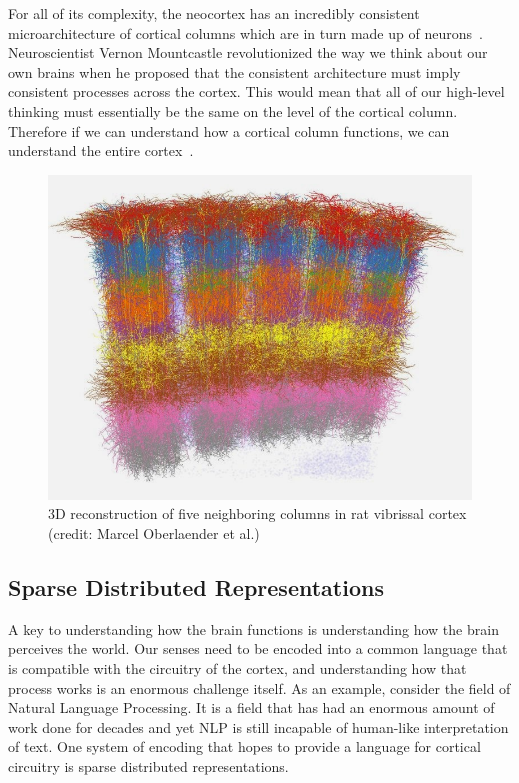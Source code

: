 \documentclass[oneside,12pt,openany]{book}
\begin{document}
	For all of its complexity, the neocortex has an incredibly consistent microarchitecture of cortical columns which are in turn made up of neurons~\cite{DiscoveriesBrainWorks}. Neuroscientist Vernon Mountcastle revolutionized the way we think about our own brains when he proposed that the consistent architecture must imply consistent processes across the cortex. This would mean that all of our high-level thinking must essentially be the same on the level of the cortical column. Therefore if we can understand how a cortical column functions, we can understand the entire cortex~\cite{DiscoveriesBrainWorks}.	
	
	\begin{figure}[!ht]
		\centering
		\includegraphics[width=.6\linewidth]{images/CorticalColumns.jpg}
		\caption[3D reconstruction of five neighboring columns in rat vibrissal cortex]{3D reconstruction of five neighboring columns in rat vibrissal cortex (credit: Marcel Oberlaender et al.)}
		\label{CorticalColumn}
	\end{figure}
	
	\subsection{Sparse Distributed Representations}\label{sec:sdr}
	
	A key to understanding how the brain functions is understanding how the brain perceives the world. Our senses need to be encoded into a common language that is compatible with the circuitry of the cortex, and understanding how that process works is an enormous challenge itself. As an example, consider the field of Natural Language Processing. It is a field that has had an enormous amount of work done for decades and yet NLP is still incapable of human-like interpretation of text. One system of encoding that hopes to provide a language for cortical circuitry is sparse distributed representations.
	
\end{document}
